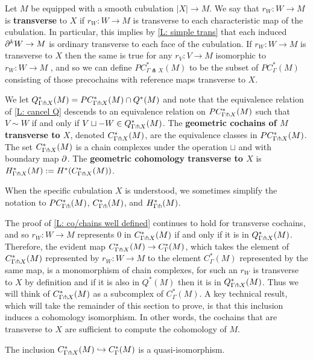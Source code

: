 \begin{definition}
Let $M$ be equipped with a smooth cubulation $|X| \to M$. We say that $r_W:W\to M$ is \textbf{transverse} to $X$ if $r_W: W\to M$ is transverse to each characteristic map of the cubulation. In particular, this implies by \cref{L: simple trans} that each induced $\partial^kW\to M$ is ordinary transverse to each face of the cubulation. If $r_W:W\to M$ is transverse to $X$ then the same is true for any $r_V:V\to M$ isomorphic to $r_W:W\to M$ , and so we can define $PC^*_{\Gamma \pitchfork X}(M)$ to be the subset of $PC^*_{\Gamma}(M)$ consisting of those precochains with reference maps transverse to $X$.

We let $Q^*_{\Gamma \pitchfork X}(M)=PC_{\Gamma\pitchfork X}^*(M)\cap Q^*(M)$ and note that the equivalence relation of \cref{L: cancel Q} descends to an equivalence relation on  $PC_{\Gamma\pitchfork X}^*(M)$ such that $V\sim W$ if and only if $V\sqcup -W\in Q^*_{\Gamma \pitchfork X}(M)$. The \textbf{geometric cochains of $M$ transverse to $X$}, denoted $C_{\Gamma\pitchfork X}^*(M)$, are the equivalence classes in $PC_{\Gamma\pitchfork X}^*(M)$. The set $C_{\Gamma\pitchfork X}^*(M)$ is a chain complexes under the operation $\sqcup$ and with boundary map $\partial$. The \textbf{geometric cohomology transverse to $X$} is $H_{\Gamma\pitchfork X}^*(M):=H^*(C_{\Gamma\pitchfork X}^*(M))$.

When the specific cubulation $X$ is understood, we sometimes simplify the notation to $PC_{\Gamma\pitchfork}^*(M)$, $C_{\Gamma\pitchfork}^*(M)$, and $H_{\Gamma\pitchfork}^*(M)$.
\end{definition}


The proof of \cref{L: co/chains well defined} continues to hold for transverse cochains, and so $r_W:W\to M$ represents $0$ in $C^*_{\Gamma\pitchfork X}(M)$ if and only if it is in $Q^*_{\Gamma \pitchfork X}(M)$. Therefore, the evident map $C^*_{\Gamma\pitchfork X}(M)\to C^*_\Gamma(M)$, which takes the element of $C^*_{\Gamma\pitchfork X}(M)$ represented by $r_W:W\to M$ to the element $C^*_\Gamma(M)$ represented by the same map, is a monomorphism of chain complexes, for such an $r_W$ is transverse to $X$ by definition and if it is also in $Q^*(M)$ then it is  in $Q^*_{\Gamma \pitchfork X}(M)$. Thus we will think of  $C^*_{\Gamma\pitchfork X}(M)$ as a subcomplex of $C^*_\Gamma(M)$.
A key technical result, which will take the remainder of this section to prove,
is that this inclusion induces a cohomology isomorphism. In other words, the cochains that are transverse to $X$ are sufficient to compute the cohomology of $M$.

\begin{theorem} \label{T: transverse complex}
The inclusion $C^*_{\Gamma \pitchfork X}(M)\hookrightarrow C^*_\Gamma(M)$ is a quasi-isomorphism.
\end{theorem}


